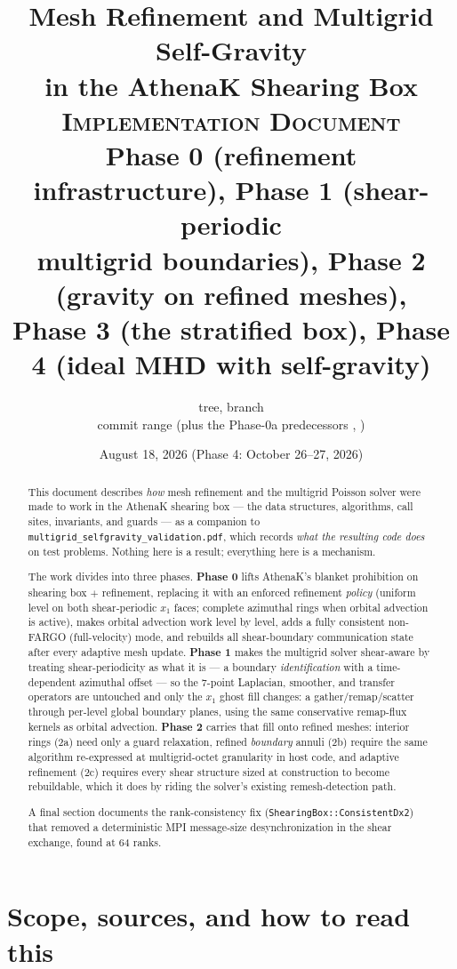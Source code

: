 \documentclass[11pt]{article}
\title{Mesh Refinement and Multigrid Self-Gravity\\
       in the AthenaK Shearing Box\\[0.4em]
       \large \textsc{Implementation Document}\\
       \large Phase 0 (refinement infrastructure), Phase 1 (shear-periodic\\
       multigrid boundaries), Phase 2 (gravity on refined meshes),\\
       Phase 3 (the stratified box), Phase 4 (ideal MHD with self-gravity)}
\author{\code{athenak-multigrid} tree, branch \code{multigrid}\\
        \small commit range \code{cc4404ba..fef5c6c9} (plus the Phase-0a
        predecessors \code{e7ef37f2}, \code{cc4404ba})}
\date{August 18, 2026 (Phase 4: October 26--27, 2026)}
\newcommand{\file}[1]{\texttt{\small #1}}
\newcommand{\fn}[1]{\texttt{\small #1}}
\begin{document}
\maketitle

\begin{abstract}
\noindent
This document describes \emph{how} mesh refinement and the multigrid Poisson solver
were made to work in the AthenaK shearing box --- the data structures, algorithms,
call sites, invariants, and guards --- as a companion to
\file{multigrid\_selfgravity\_validation.pdf}, which records \emph{what the resulting
code does} on test problems. Nothing here is a result; everything here is a
mechanism.

The work divides into three phases. \textbf{Phase 0} lifts AthenaK's blanket
prohibition on shearing box $+$ refinement, replacing it with an enforced refinement
\emph{policy} (uniform level on both shear-periodic $x_1$ faces; complete azimuthal
rings when orbital advection is active), makes orbital advection work level by level,
adds a fully consistent non-FARGO (full-velocity) mode, and rebuilds all
shear-boundary communication state after every adaptive mesh update.
\textbf{Phase 1} makes the multigrid solver shear-aware by treating shear-periodicity
as what it is --- a boundary \emph{identification} with a time-dependent azimuthal
offset --- so the 7-point Laplacian, smoother, and transfer operators are untouched
and only the $x_1$ ghost fill changes: a gather/remap/scatter through per-level global
boundary planes, using the same conservative remap-flux kernels as orbital advection.
\textbf{Phase 2} carries that fill onto refined meshes: interior rings (2a) need only
a guard relaxation, refined \emph{boundary} annuli (2b) require the same algorithm
re-expressed at multigrid-octet granularity in host code, and adaptive refinement (2c)
requires every shear structure sized at construction to become rebuildable, which it
does by riding the solver's existing remesh-detection path.

A final section documents the rank-consistency fix (\fn{ShearingBox::ConsistentDx2})
that removed a deterministic MPI message-size desynchronization in the shear exchange,
found at 64 ranks.
\end{abstract}

\tableofcontents
\newpage

\section{Scope, sources, and how to read this}
\label{sec:scope}
\end{document}
